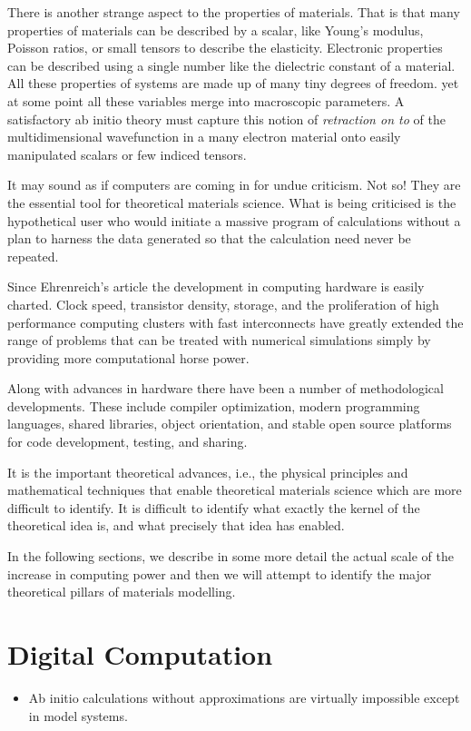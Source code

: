 There is another strange aspect to the properties of materials.
That is that many properties of materials can be described by a scalar, 
like Young's modulus, Poisson ratios, or small tensors to 
describe the elasticity. 
Electronic properties can be described using a single number 
like the dielectric constant of a material.
All these properties of systems are made up of many tiny degrees of freedom.
yet at some point all these variables merge into macroscopic parameters.
A satisfactory ab initio theory must capture this notion of {\it retraction on to} of
the multidimensional wavefunction in a many electron material onto easily manipulated
scalars or few indiced tensors.

It may sound as if computers are coming in for undue criticism. Not so! They
are the essential tool for theoretical materials science. What is being criticised
is the hypothetical user who would initiate a massive program of calculations without a
plan to harness the data generated so that the calculation need never be repeated.

Since Ehrenreich's article the development in computing hardware is easily charted. 
Clock speed, transistor density, storage, and the proliferation of high 
performance computing clusters with fast interconnects have greatly extended 
the range of problems that can be treated with numerical simulations
simply by providing more computational horse power.

Along with advances in hardware there have been a number
of methodological developments. These include compiler 
optimization, modern programming languages, 
shared libraries, object orientation, and stable open source 
platforms for code development, testing, and sharing. 

It is the important theoretical advances, i.e., the physical principles and
mathematical techniques that enable theoretical materials science 
which are more difficult to identify. It is difficult to identify what exactly 
the kernel of the theoretical idea is, and what precisely that idea has enabled. 

In the following sections, we describe in some more detail the 
actual scale of the increase in computing power and then we will
attempt to identify the major theoretical pillars of 
materials modelling.

\section{Digital Computation}
\label{sec:riseofcomp}
\begin{itemize}
\item Ab initio calculations without approximations are virtually impossible 
      except in model systems.
\end{itemize}

